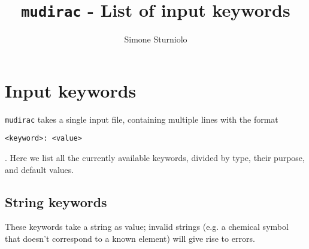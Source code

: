 \documentclass[]{article}
\title{\texttt{mudirac} - List of input keywords}
\author{Simone Sturniolo}
\begin{document}
\maketitle

\section{Input keywords}\label{APP:keyw}

\texttt{mudirac} takes a single input file, containing multiple lines with the format

\begin{verbatim}
<keyword>: <value>
\end{verbatim}

. Here we list all the currently available keywords, divided by type, their purpose, and default values.
\subsection{String keywords}

These keywords take a string as value; invalid strings (e.g. a chemical symbol that doesn't correspond to a known element) will give rise to errors.
\end{document}
